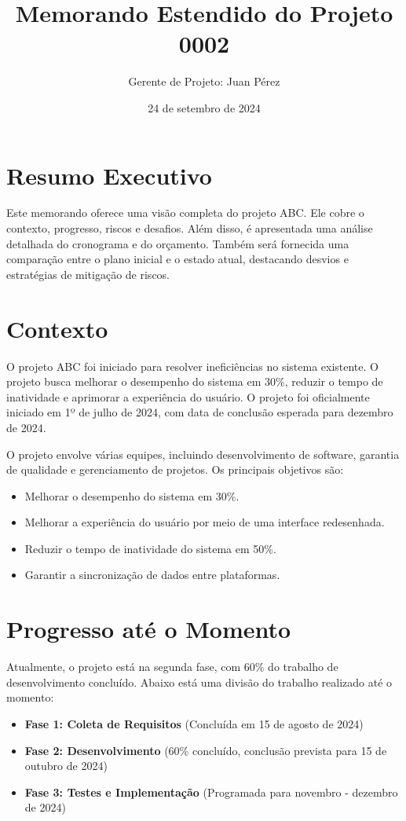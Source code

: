 \documentclass[12pt]{article}
\title{Memorando Estendido do Projeto 0002}
\author{Gerente de Projeto: Juan Pérez}
\date{24 de setembro de 2024}
\begin{document}
\maketitle

\tableofcontents
\newpage

\section{Resumo Executivo}
Este memorando oferece uma visão completa do projeto ABC. Ele cobre o contexto, progresso, riscos e desafios. Além disso, é apresentada uma análise detalhada do cronograma e do orçamento. Também será fornecida uma comparação entre o plano inicial e o estado atual, destacando desvios e estratégias de mitigação de riscos.

\section{Contexto}
O projeto ABC foi iniciado para resolver ineficiências no sistema existente. O projeto busca melhorar o desempenho do sistema em 30\%, reduzir o tempo de inatividade e aprimorar a experiência do usuário. O projeto foi oficialmente iniciado em 1º de julho de 2024, com data de conclusão esperada para dezembro de 2024.

O projeto envolve várias equipes, incluindo desenvolvimento de software, garantia de qualidade e gerenciamento de projetos. Os principais objetivos são:
\begin{itemize}
    \item Melhorar o desempenho do sistema em 30\%.
    \item Melhorar a experiência do usuário por meio de uma interface redesenhada.
    \item Reduzir o tempo de inatividade do sistema em 50\%.
    \item Garantir a sincronização de dados entre plataformas.
\end{itemize}

\section{Progresso até o Momento}
Atualmente, o projeto está na segunda fase, com 60\% do trabalho de desenvolvimento concluído. Abaixo está uma divisão do trabalho realizado até o momento:

\begin{itemize}
    \item \textbf{Fase 1: Coleta de Requisitos} (Concluída em 15 de agosto de 2024)
    \item \textbf{Fase 2: Desenvolvimento} (60\% concluído, conclusão prevista para 15 de outubro de 2024)
    \item \textbf{Fase 3: Testes e Implementação} (Programada para novembro - dezembro de 2024)
\end{itemize}
\end{document}
